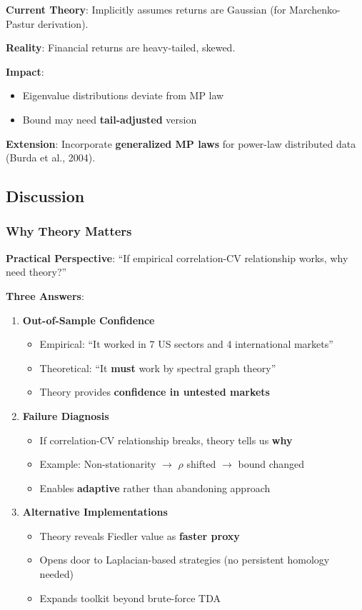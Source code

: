 \textbf{Current Theory}: Implicitly assumes returns are Gaussian (for Marchenko-Pastur derivation).

\textbf{Reality}: Financial returns are heavy-tailed, skewed.

\textbf{Impact}:
\begin{itemize}
\item Eigenvalue distributions deviate from MP law
\item Bound may need \textbf{tail-adjusted} version
\end{itemize}

\textbf{Extension}: Incorporate \textbf{generalized MP laws} for power-law distributed data (Burda et al., 2004).

\subsection{Discussion}

\subsubsection{Why Theory Matters}

\textbf{Practical Perspective}: ``If empirical correlation-CV relationship works, why need theory?''

\textbf{Three Answers}:

\begin{enumerate}
\item \textbf{Out-of-Sample Confidence}
   \begin{itemize}
   \item Empirical: ``It worked in 7 US sectors and 4 international markets''
   \item Theoretical: ``It \textbf{must} work by spectral graph theory''
   \item Theory provides \textbf{confidence in untested markets}
   \end{itemize}

\item \textbf{Failure Diagnosis}
   \begin{itemize}
   \item If correlation-CV relationship breaks, theory tells us \textbf{why}
   \item Example: Non-stationarity $\rightarrow$ $\rho$ shifted $\rightarrow$ bound changed
   \item Enables \textbf{adaptive} rather than abandoning approach
   \end{itemize}

\item \textbf{Alternative Implementations}
   \begin{itemize}
   \item Theory reveals Fiedler value as \textbf{faster proxy}
   \item Opens door to Laplacian-based strategies (no persistent homology needed)
   \item Expands toolkit beyond brute-force TDA
   \end{itemize}
\end{enumerate}

